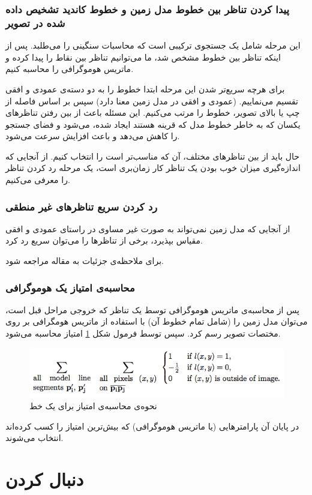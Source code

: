 \documentclass{report}
\begin{document}
\subsubsection{پیدا کردن تناظر بین خطوط مدل زمین و خطوط کاندید تشخیص داده شده در تصویر}
این مرحله شامل یک جستجوی ترکیبی است که محاسبات سنگینی را می‌طلبد. پس از اینکه تناظر بین خطوط مشخص شد، ما می‌توانیم تناظر بین نقاط را پیدا کرده و ماتریس هوموگرافی را محاسبه کنیم.

برای هرچه سریع‌تر شدن این مرحله ابتدا خطوط را به دو دسته‌ی عمودی و افقی تقسیم می‌نماییم. (عمودی و افقی در مدل زمین معنا دارد) سپس بر اساس فاصله از چپ یا بالای تصویر، خطوط را مرتب می‌کنیم. این مسئله باعث از بین رفتن تناظرهای یکسان که به خاطر خطوط مدل که قرینه هستند ایجاد شده، می‌شود و فضای جستجو را کاهش می‌دهد و باعث افزایش سرعت می‌شود.

حال باید از بین تناظرهای مختلف، آن که مناسب‌تر است را انتخاب کنیم. از آنجایی که اندازه‌گیری میزان خوب بودن یک تناظر کار زمان‌بری است، یک مرحله رد کردن تناظر را معرفی می‌کنیم.
\subsubsection{رد کردن سریع تناظرهای غیر منطقی}
از آنجایی که مدل زمین نمی‌تواند به صورت غیر مساوی در راستای عمودی و افقی مقیاس بپذیرد، برخی از تناظرها را می‌توان سریع رد کرد.

برای ملاحظه‌ی جزئیات به مقاله مراجعه شود.
\subsubsection{محاسبه‌ی امتیاز یک هوموگرافی}
پس از محاسبه‌ی ماتریس هوموگرافی توسط یک تناظر که خروجی مراحل قبل است، می‌توان مدل زمین را (شامل تمام خطوط آن) با استفاده از ماتریس هومگرافی بر روی مختصات تصویر رسم کرد. سپس توسط فرمول شکل \ref{score} امتیاز محاسبه می‌شود.

\begin{figure}
\centering
\includegraphics[scale=0.5]{score.png}
\caption{نحوه‌ی محاسبه‌ی امتیاز برای یک خط}
\label{score}
\end{figure}

در پایان آن پارامترهایی (یا ماتریس هوموگرافی) که بیش‌ترین امتیاز را کسب کرده‌اند انتخاب می‌شوند.
\section{دنبال کردن}

\begin{latin}
{}

\end{latin}
\end{document}
